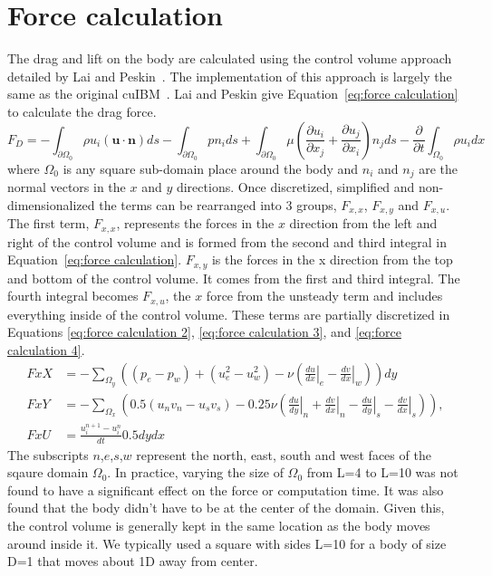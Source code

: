 \section{Force calculation}
\label{Force Calculation}

The drag and lift on the body are calculated using the control volume approach detailed by Lai and Peskin~\cite{lai2000immersed}.
The implementation of this approach is largely the same as the original cuIBM~\cite{layton2011cuibm}. 
Lai and Peskin give Equation~\eqref{eq:force calculation} to calculate the drag force. 
\begin{equation}\label{eq:force calculation}
F_D=-\int_{\partial \Omega_0} \rho u_i(\textbf{u}\cdot \textbf{n})ds- \int_{\partial \Omega_0}pn_ids+\int_{\partial \Omega_0}\mu \left(\frac{\partial u_i}{\partial x_j}+\frac{\partial u_j}{\partial x_i}\right)n_jds-\frac{\partial}{\partial t}\int_{\Omega_0}\rho u_i dx
\end{equation}
where $\Omega_0$ is any square sub-domain place around the body and $n_i$ and $n_j$ are the normal vectors in the $x$ and $y$ directions. 
Once discretized, simplified and non-dimensionalized the terms can be rearranged into 3 groups, $F_{x,x}$, $F_{x,y}$ and $F_{x,u}$. 
The first term, $F_{x,x}$, represents the forces in the $x$ direction from the left and right of the control volume and is formed from the second and third integral in Equation~\eqref{eq:force calculation}. 
$F_{x,y}$ is the forces in the x direction from the top and bottom of the control volume. 
It comes from the first and third integral. 
The fourth integral becomes $F_{x,u}$, the $x$ force from the unsteady term and includes everything inside of the control volume. 
These terms are partially discretized in Equations \eqref{eq:force calculation 2}, \eqref{eq:force calculation 3}, and \eqref{eq:force calculation 4}. 
\begin{align}
FxX &=-\sum_{\Omega_y}\left((p_e-p_w)+(u_e^2-u_w^2)-\nu\left(\left.\frac{du}{dx}\right|_e-\left.\frac{dv}{dx}\right|_w\right)\right)dy\label{eq:force calculation 2}\\
FxY &=-\sum_{\Omega_x}\left(0.5(u_nv_n-u_sv_s)-0.25\nu \left(\left.\frac{du}{dy}\right|_n+\left.\frac{dv}{dx}\right|_n-\left.\frac{du}{dy}\right|_s-\left.\frac{dv}{dx}\right|_s\right)\right),\label{eq:force calculation 3}\\
FxU &=\frac{u_i^{n+1}-u_i^{n}}{dt}0.5dydx\;\label{eq:force calculation 4}
\end{align}
The subscripts $n$,$e$,$s$,$w$ represent the north, east, south and west faces of the sqaure domain $\Omega_0$.
In practice, varying the size of $\Omega_0$ from L=4 to L=10 was not found to have a significant effect on the force or computation time.
It was also found that the body didn't have to be at the center of the domain.
Given this, the control volume is generally kept in the same location as the body moves around inside it.
We typically used a square with sides L=10 for a body of size D=1 that moves about 1D away from center.

